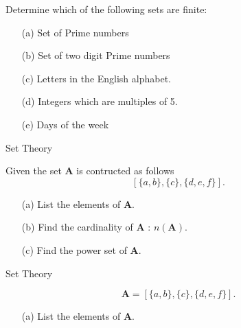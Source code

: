 \documentclass[11pt,a4paper,titlepage,oneside,openany]{article}
\numberwithin{equation}{section}
\numberwithin{algorithm}{section}
\numberwithin{figure}{section}
\numberwithin{table}{section}
\begin{document}
{%
Determine which of the following sets are finite:
\begin{itemize}
\item[(a)] Set of Prime numbers %
\item[(b)] Set of two digit Prime numbers %
\item[(c)] Letters in the English alphabet.
\item[(d)] Integers which are multiples of 5.
\item[(e)] Days of the week %
\end{itemize}







{Set Theory}

Given the set \textbf{A} is contructed as follows 
\[ [\{a, b\}, \{c\}, \{d, e, f \} ]. \]

\begin{itemize}
\item[(a)] List the elements of \textbf{A}. 
\item[(b)] Find the cardinality of \textbf{A} : $n(\boldsymbol{A})$. 
\item[(c)] Find the power set of \textbf{A}.
\end{itemize}




{Set Theory}

\[\boldsymbol{A} = [\{a, b\}, \{c\},\{d, e, f \}]. \]
\begin{itemize}
\item[(a)] List the elements of \textbf{A}. 
\end{itemize}



}
\end{document}
